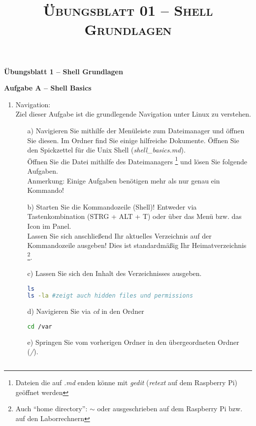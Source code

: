 \documentclass[paper=a4,fontsize=11pt]{scrartcl}%
\title{	
\normalfont \normalsize 
\textsc{Übungsblatt 01 -- Shell Grundlagen}
}
\numberwithin{equation}{section}
\begin{document}
\begin{center}
\Large{\textbf{Übungsblatt 1 -- Shell Grundlagen}}
\end{center}
\begin{center}\Large{\textbf{Aufgabe A -- Shell Basics}}\end{center}\vskip0.25in
\begin{enumerate}
\item Navigation:\\
Ziel dieser Aufgabe ist die grundlegende Navigation unter Linux zu verstehen.
	\begin{itemize}
		\item[a)] Navigieren Sie mithilfe der Menüleiste zum Dateimanager und öffnen Sie diesen. Im Ordner  find Sie einige hilfreiche Dokumente. Öffnen Sie den Spickzettel für die Unix Shell (\emph{shell\_basics.md}).\\
Öffnen Sie die Datei mithilfe des Dateimanagers \footnote{Dateien die auf \emph{.md} enden könne mit \emph{gedit} (\emph{retext} auf dem Raspberry Pi) geöffnet werden} und lösen Sie folgende Aufgaben.\\
Anmerkung: Einige Aufgaben benötigen mehr als nur genau ein Kommando!
		\item[b)] Starten Sie die Kommandozeile (Shell)! Entweder via Tastenkombination  (STRG + ALT + T) oder über das Menü bzw. das Icon im Panel.\\
		Lassen Sie sich anschließend Ihr aktuelles Verzeichnis auf der Kommandozeile ausgeben! Dies ist standardmäßig Ihr Heimatverzeichnis \footnote{Auch \enquote{home directory}: $\sim$ oder ausgeschrieben  auf dem Raspberry Pi bzw.  auf den Laborrechnern}.
		\item[c)] Lassen Sie sich den Inhalt des Verzeichnisses ausgeben.
		\begin{lstlisting}[style=Bash, language=Bash]
ls
ls -la #zeigt auch hidden files und permissions
		\end{lstlisting}
		\item[d)] Navigieren Sie via \emph{cd} in den Ordner 
		\begin{lstlisting}[style=Bash, language=Bash]
cd /var
		\end{lstlisting}
		\item[e)] Springen Sie vom vorherigen Ordner in den übergeordneten Ordner (\emph{/}).
		\begin{lstlisting}[style=Bash, language=Bash]

\end{lstlisting}
\end{itemize}
\end{enumerate}
\end{document}
